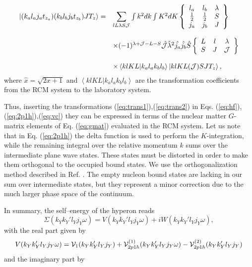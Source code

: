 \begin{equation}
   \begin{array}{ll}
     &\\
     \left | (k_al_aj_at_{z_a})(k_bl_bj_bt_{z_b})JT_z\right \rangle =&
      {\displaystyle \sum_{lL\lambda S{\cal J}}}\int k^{2}dk\int K^{2}dK
      \left\{\begin{array}{ccc}
      l_a&l_b&\lambda\\\frac{1}{2}&\frac{1}{2}&S\\
      j_a&j_b&J\end{array}
      \right\}\\&\\
      &\times (-1)^{\lambda +{\cal J}-L-S}
      \hat{{\cal J}}\hat{\lambda}^{2}
      \hat{j_{a}}\hat{j_{b}}\hat{S}
      \left\{\begin{array}{ccc}L&l&\lambda\\S&J&{\cal J}
      \end{array}\right\}\\&\\
      &\times \left\langle klKL| k_al_ak_bl_b\right\rangle
      \left | klKL({\cal J})SJT_z\right \rangle ,
   \end{array}
\label{eq:trans2}
\end{equation}
where $\hat{x}=\sqrt{2x+1}$ and  $\left\langle klKL|
k_al_ak_bl_b\right\rangle$ are
the transformation coefficients from the RCM system to the laboratory 
system.

Thus, inserting the transformations
(\ref{eq:trans1}),(\ref{eq:trans2})
in Eqs. (\ref{eq:hf}),(\ref{eq:2p1h}),(\ref{eq:vc}) they
can be expressed in terms of the nuclear matter $G$-matrix elements
of Eq. (\ref{eq:gmat}) evaluated in the RCM system.
Let us note that in Eq. (\ref{eq:2p1h}) the delta function is used to
perform the $K$-integration, while the remaining integral over the
relative momentum $k$ sums over the intermediate plane wave states.
These states must be distorted in order to make them orthogonal to the
occupied bound states. We use the orthogonalization method described
in Ref. \cite{bbmp92}. The empty nucleon bound states are lacking in our sum
over intermediate states,
but they represent a minor correction due to
the much larger phase space of the continuum.

In summary, the self--energy of the hyperon reads
\begin{equation}
    \Sigma(k_{Y}k_{Y}'l_{Y}j_{Y}\omega)=
    V(k_{Y}k_{Y}'l_{Y}j_{Y}\omega)+
    iW(k_{Y}k_{Y}'l_{Y}j_{Y}\omega),
    \label{eq:self_ener}
\end{equation}
with the real part given by
\begin{equation}
    V(k_{Y}k_{Y}'l_{Y}j_{Y}\omega)=
       {\cal V}_{1}(k_{Y}k_{Y}'l_{Y}j_{Y})+
       {\cal V}^{(1)}_{2p1h}(k_{Y}k_{Y}'l_{Y}j_{Y}
        \omega)-
       {\cal V}^{(2)}_{2p1h}(k_{Y}k_{Y}'l_{Y}j_{Y}
       )
       \label{eq:realV}
\end{equation}
and the imaginary part by

